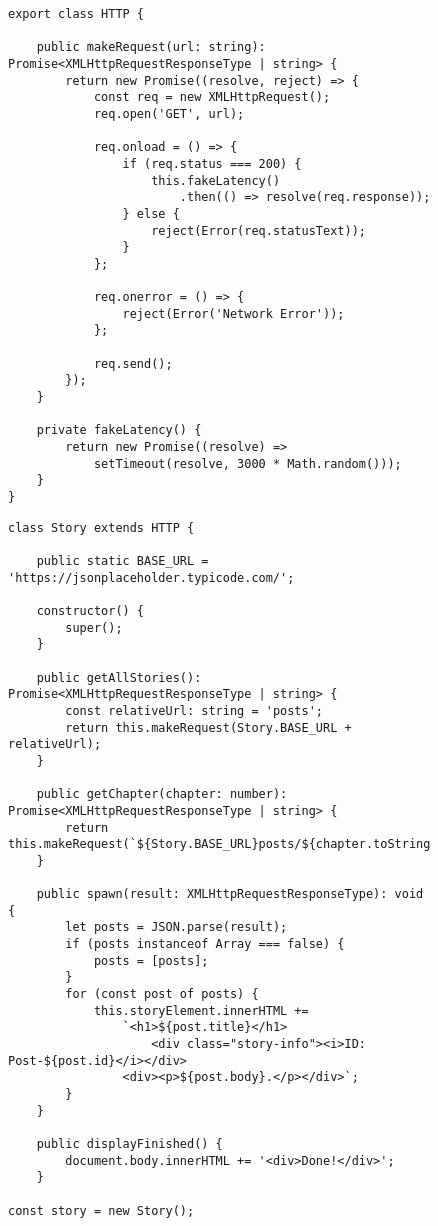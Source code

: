 \begin{figure}[H]
\begin{lstlisting}
export class HTTP {

    public makeRequest(url: string): Promise<XMLHttpRequestResponseType | string> {
        return new Promise((resolve, reject) => {
            const req = new XMLHttpRequest();
            req.open('GET', url);

            req.onload = () => {
                if (req.status === 200) {
                    this.fakeLatency()
                        .then(() => resolve(req.response));
                } else {
                    reject(Error(req.statusText));
                }
            };

            req.onerror = () => {
                reject(Error('Network Error'));
            };

            req.send();
        });
    }

    private fakeLatency() {
        return new Promise((resolve) =>
            setTimeout(resolve, 3000 * Math.random()));
    }
}
\end{lstlisting}
\end{figure}

\begin{figure}[H]
\begin{lstlisting}
class Story extends HTTP {

    public static BASE_URL = 'https://jsonplaceholder.typicode.com/';

    constructor() {
        super();
    }

    public getAllStories(): Promise<XMLHttpRequestResponseType | string> {
        const relativeUrl: string = 'posts';
        return this.makeRequest(Story.BASE_URL + relativeUrl);
    }

    public getChapter(chapter: number): Promise<XMLHttpRequestResponseType | string> {
        return this.makeRequest(`${Story.BASE_URL}posts/${chapter.toString()}`);
    }

    public spawn(result: XMLHttpRequestResponseType): void {
        let posts = JSON.parse(result);
        if (posts instanceof Array === false) {
            posts = [posts];
        }
        for (const post of posts) {
            this.storyElement.innerHTML +=
                `<h1>${post.title}</h1>
                    <div class="story-info"><i>ID: Post-${post.id}</i></div>
                <div><p>${post.body}.</p></div>`;
        }
    }

    public displayFinished() {
        document.body.innerHTML += '<div>Done!</div>';
    }

const story = new Story();
\end{lstlisting}
\end{figure}

